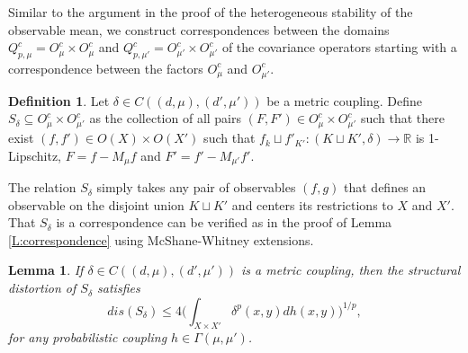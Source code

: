 \documentclass[11pt]{article}
\newtheorem{lemma}[theorem]{Lemma}
\theoremstyle{definition}
\newtheorem{definition}[theorem]{Definition}
\newcommand{\real}{\ensuremath{\mathbb{R}}}
\newcommand{\obs}[1]{\ensuremath{O(#1)}}
\newcommand{\cobs}[1]{\ensuremath{O^c_{#1}}}
\newcommand{\pcobsp}[1]{\ensuremath{Q^c_{p,#1}}}
\newcommand{\mean}[1]{\ensuremath{M_\mathcal{#1}}}
\begin{document}
Similar to the argument in the proof of the heterogeneous stability of the observable mean, we construct correspondences between the domains $\pcobsp{\mu} = \cobs{\mu} \times \cobs{\mu}$ and $\pcobsp{\mu'} = \cobs{\mu'} \times \cobs{\mu'}$ of the covariance operators starting with a correspondence between the factors $\cobs{\mu}$ and $\cobs{\mu'}$. 

\begin{definition} \label{D:paircorr}
Let $\delta \in C((d,\mu),(d',\mu'))$ be a metric coupling. Define $S_\delta \subseteq \cobs{\mu} \times \cobs{\mu'}$ as the collection of all pairs $(F,F') \in \cobs{\mu} \times \cobs{\mu'}$ such that there exist $(f,f') \in \obs{X} \times \obs{X'}$ such that $f_k \sqcup f'_{K'} \colon (K \sqcup K', \delta) \to \real$ is 1-Lipschitz, $F = f-\mean{\mu}f$ and $F'=f'-\mean{\mu'}f'$.
\end{definition}

The relation $S_\delta$ simply takes any pair of observables $(f,g)$ that defines an observable on the disjoint union $K \sqcup K'$ and centers its restrictions to $X$ and $X'$. That $S_\delta$ is a correspondence can be verified as in the proof of Lemma \ref{L:correspondence} using McShane-Whitney extensions.

\begin{lemma} \label{L:sdis}
If $\delta \in C((d,\mu),(d',\mu'))$ is a metric coupling, then the structural distortion of $S_\delta$ satisfies 
\[
dis(S_\delta) \leq 4 \Big( \int_{X \times X'} \delta^p (x,y) dh (x,y) \Big)^{1/p},
\]
for any probabilistic coupling $h \in \Gamma(\mu,\mu')$.
\end{lemma}
\end{document}
